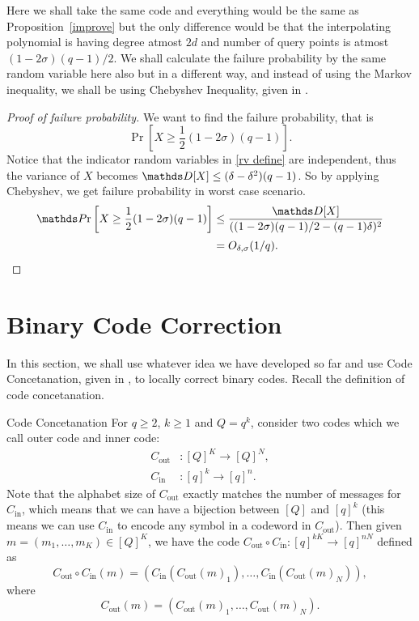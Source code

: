 Here we shall take the same code and everything would be the same as Proposition~\ref{improve} but the only difference would be that the interpolating polynomial is having degree atmost $2d$ and number of query points is atmost $(1-2\sigma)(q-1)/2$. We shall calculate the failure probability by the same random variable here also but in a different way, and instead of using the Markov inequality, we shall be using Chebyshev Inequality, given in \cite{Alon2000}.

\begin{proof}[Proof of failure probability]
		We want to find the failure probability, that is 
		\[
		\Pr\left[X\geq \frac{1}{2}(1-2\sigma)(q-1)\right].
		\]
		Notice that the indicator random variables in \ref{rv define} are independent, thus the variance of $X$ becomes
		$\D[X] \leq (\delta - \delta^2)(q-1)$. So by applying Chebyshev, we get failure probability in worst case scenario.
		\begin{align*}
				\Pr\left[X\geq \frac{1}{2}(1-2\sigma)(q-1)\right]
				& \leq \frac{\D[X]}{((1-2\sigma)(q-1)/2 - (q-1)\delta)^2} \\[0.2em]
				& = O_{\delta, \sigma}(1/q).
		\end{align*}
\end{proof}

\section{Binary Code Correction}
In this section, we shall use whatever idea we have developed so far and use Code Concetanation, given in \cite{GRS25}, to locally correct binary codes. Recall the definition of code concetanation.
\begin{definition}{Code Concetanation}{}
		For $q \geq 2$, $k \geq 1$ and $Q = q^k$, consider two codes which we call outer code and inner code:
		\begin{align}
			C_{\text{out}} &: [Q]^K \to [Q]^N, \nonumber \\
			C_{\text{in}} &: [q]^k \to [q]^n. \nonumber
		\end{align}
		Note that the alphabet size of $C_{\text{out}}$ exactly matches the number of messages for $C_{\text{in}}$, which means that we can have a bijection between $[Q]$ and $[q]^k$ (this means we can use $C_{\text{in}}$ to encode any symbol in a codeword in $C_{\text{out}}$). Then given $m = (m_1, \ldots, m_K) \in [Q]^K$, we have the code $C_{\text{out}} \circ C_{\text{in}} : [q]^{kK} \to [q]^{nN}$ defined as
		\[
		C_{\text{out}} \circ C_{\text{in}}(m) = \left( C_{\text{in}}(C_{\text{out}}(m)_1), \ldots, C_{\text{in}}(C_{\text{out}}(m)_N) \right),
		\]
		where
		\[
		C_{\text{out}}(m) = \left( C_{\text{out}}(m)_1, \ldots, C_{\text{out}}(m)_N \right).
		\]
		
\end{definition}

